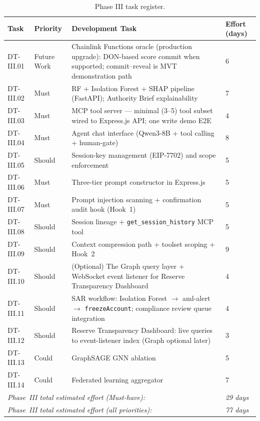 \documentclass[12pt,a4paper]{report}
\newcommand{\tableheadcolor}{\rowcolor{TableHeadBg}}
\begin{document}
\begin{table}[H]
\centering
\caption[Phase III task register]{Phase III task register.}
\label{tab:phaseIII-tasks}
\begin{tabular}{p{1.8cm}p{1.8cm}p{7.5cm}p{1.5cm}}
\toprule
\tableheadcolor
\textbf{Task} & \textbf{Priority} & \textbf{Development Task} & \textbf{Effort (days)} \\
\midrule
DT-III.01 & Future Work & Chainlink Functions oracle (production upgrade): DON-based score commit when supported; commit--reveal is MVT demonstration path & 6 \\
DT-III.02 & Must & RF + Isolation Forest + SHAP pipeline (FastAPI); Authority Brief explainability & 7 \\
DT-III.03 & Must & MCP tool server --- minimal (3--5) tool subset wired to Express.js API; one write demo E2E & 4 \\
DT-III.04 & Must & Agent chat interface (Qwen3-8B + tool calling + human-gate) & 8 \\
DT-III.05 & Should & Session-key management (EIP-7702) and scope enforcement & 5 \\
DT-III.06 & Must & Three-tier prompt constructor in Express.js & 5 \\
DT-III.07 & Must & Prompt injection scanning + confirmation audit hook (Hook~1) & 5 \\
DT-III.08 & Should & Session lineage + \texttt{get\_session\_history} MCP tool & 5 \\
DT-III.09 & Should & Context compression path + toolset scoping + Hook~2 & 9 \\
DT-III.10 & Should & (Optional) The Graph query layer + WebSocket event listener for Reserve Transparency Dashboard & 4 \\
DT-III.11 & Should & SAR workflow: Isolation Forest $\to$ aml-alert $\to$ \texttt{freezeAccount}; compliance review queue integration & 4 \\
DT-III.12 & Should & Reserve Transparency Dashboard: live queries to event-listener index (Graph optional later) & 3 \\
DT-III.13 & Could & GraphSAGE GNN ablation & 5 \\
DT-III.14 & Could & Federated learning aggregator & 7 \\
\multicolumn{3}{l}{\textit{Phase~III total estimated effort (Must-have):}} & \textit{29 days} \\
\multicolumn{3}{l}{\textit{Phase~III total estimated effort (all priorities):}} & \textit{77 days} \\
\bottomrule
\end{tabular}
\end{table}
\end{document}
